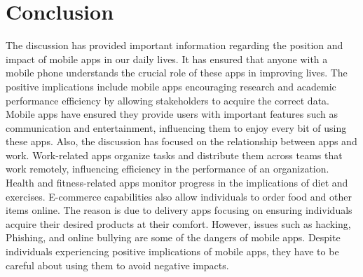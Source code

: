 \documentclass{article}
\begin{document}
\section*{Conclusion}
The discussion has provided important information regarding the position and impact of mobile apps in our daily lives. It has ensured that anyone with a mobile phone understands the crucial role of these apps in improving lives. The positive implications include mobile apps encouraging research and academic performance efficiency by allowing stakeholders to acquire the correct data. Mobile apps have ensured they provide users with important features such as communication and entertainment, influencing them to enjoy every bit of using these apps. Also, the discussion has focused on the relationship between apps and work. Work-related apps organize tasks and distribute them across teams that work remotely, influencing efficiency in the performance of an organization. Health and fitness-related apps monitor progress in the implications of diet and exercises. E-commerce capabilities also allow individuals to order food and other items online. The reason is due to delivery apps focusing on ensuring individuals acquire their desired products at their comfort. However, issues such as hacking, Phishing, and online bullying are some of the dangers of mobile apps. Despite individuals experiencing positive implications of mobile apps, they have to be careful about using them to avoid negative impacts. 
\end{document}

